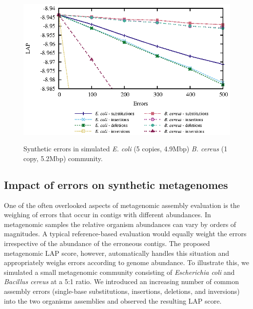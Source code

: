 \begin{figure}[htb!]
\begin{center}
\includegraphics[width=.8\textwidth]{errors}
\end{center}
\renewcommand{\baselinestretch}{1}
\small\normalsize
\begin{quote}
\caption[Synthetic errors in simulated \emph{E. coli} and \emph{B. cereus} (1 copy, 5.2Mbp) community]{Synthetic errors in simulated \emph{E. coli} (5 copies, 4.9Mbp) \emph{B. cereus} (1 copy, 5.2Mbp) community.}
\label{fig:errors}
\end{quote}
\end{figure}
\renewcommand{\baselinestretch}{2}
\small\normalsize

\subsection{Impact of errors on synthetic metagenomes}

One of the often overlooked aspects of metagenomic assembly evaluation is the weighing of errors that occur in contigs with different abundances.
In metagenomic samples the relative organism abundances can vary by orders of magnitudes.
A typical reference-based evaluation would equally weight the errors irrespective of the abundance of the erroneous contigs.
The proposed metagenomic LAP score, however, automatically handles this situation and appropriately weighs errors according to genome abundance.
To illustrate this, we simulated a small metagenomic community consisting of \emph{Escherichia coli} and \emph{Bacillus cereus} at a 5:1 ratio.
We introduced an increasing number of common assembly errors (single-base substitutions, insertions, deletions, and inversions) into the two organisms assemblies and observed the resulting LAP score.

